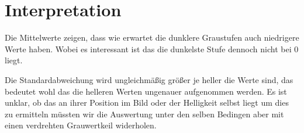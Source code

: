 \section{Interpretation}
\label{chap:VERSUCH_1_INTERPRETATION}

Die Mittelwerte zeigen, dass wie erwartet die dunklere Graustufen auch niedrigere Werte haben. Wobei es interessant ist das die dunkelste Stufe dennoch nicht bei 0 liegt.

Die Standardabweichung wird ungleichmäßig größer je heller die Werte sind, das bedeutet wohl das die helleren Werten ungenauer aufgenommen werden.
Es ist unklar, ob das an ihrer Position im Bild oder der Helligkeit selbst liegt um dies zu ermitteln müssten wir die Auswertung unter den selben Bedingen aber mit einen verdrehten Grauwertkeil widerholen.
